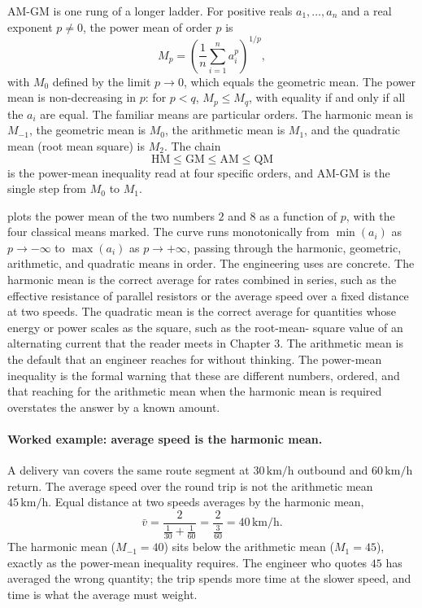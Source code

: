 AM-GM is one rung of a longer ladder. For positive reals $a_{1},
\ldots, a_{n}$ and a real exponent $p \neq 0$, the power mean of order
$p$ is
\[
M_{p} = \left(\frac{1}{n} \sum_{i=1}^{n} a_{i}^{p}\right)^{1/p},
\]
with $M_{0}$ defined by the limit $p \to 0$, which equals the
geometric mean. The power mean is non-decreasing in $p$: for $p < q$,
$M_{p} \leq M_{q}$, with equality if and only if all the $a_{i}$ are
equal. The familiar means are particular orders. The harmonic mean is
$M_{-1}$, the geometric mean is $M_{0}$, the arithmetic mean is $M_{1}$,
and the quadratic mean (root mean square) is $M_{2}$. The chain
\[
\mathrm{HM} \leq \mathrm{GM} \leq \mathrm{AM} \leq \mathrm{QM}
\]
is the power-mean inequality read at four specific orders, and AM-GM
is the single step from $M_{0}$ to $M_{1}$.



 plots the power mean of the two
numbers $2$ and $8$ as a function of $p$, with the four classical
means marked. The curve runs monotonically from $\min(a_{i})$ as
$p \to -\infty$ to $\max(a_{i})$ as $p \to +\infty$, passing through
the harmonic, geometric, arithmetic, and quadratic means in order. The
engineering uses are concrete. The harmonic mean is the correct
average for rates combined in series, such as the effective resistance
of parallel resistors or the average speed over a fixed distance at
two speeds. The quadratic mean is the correct average for quantities
whose energy or power scales as the square, such as the root-mean-
square value of an alternating current that the reader meets in
Chapter 3. The arithmetic mean is the default that an engineer reaches
for without thinking. The power-mean inequality is the formal warning
that these are different numbers, ordered, and that reaching for the
arithmetic mean when the harmonic mean is required overstates the
answer by a known amount.

\paragraph{Worked example: average speed is the harmonic mean.}
A delivery van covers the same route segment at $30 \,\si{\kilo\meter
\per\hour}$ outbound and $60 \,\si{\kilo\meter\per\hour}$ return. The
average speed over the round trip is not the arithmetic mean $45
\,\si{\kilo\meter\per\hour}$. Equal distance at two speeds averages by
the harmonic mean,
\[
\bar v = \frac{2}{\tfrac{1}{30} + \tfrac{1}{60}}
= \frac{2}{\tfrac{3}{60}} = 40 \,\si{\kilo\meter\per\hour}.
\]
The harmonic mean ($M_{-1} = 40$) sits below the arithmetic mean
($M_{1} = 45$), exactly as the power-mean inequality requires. The
engineer who quotes $45$ has averaged the wrong quantity; the trip
spends more time at the slower speed, and time is what the average must
weight.

